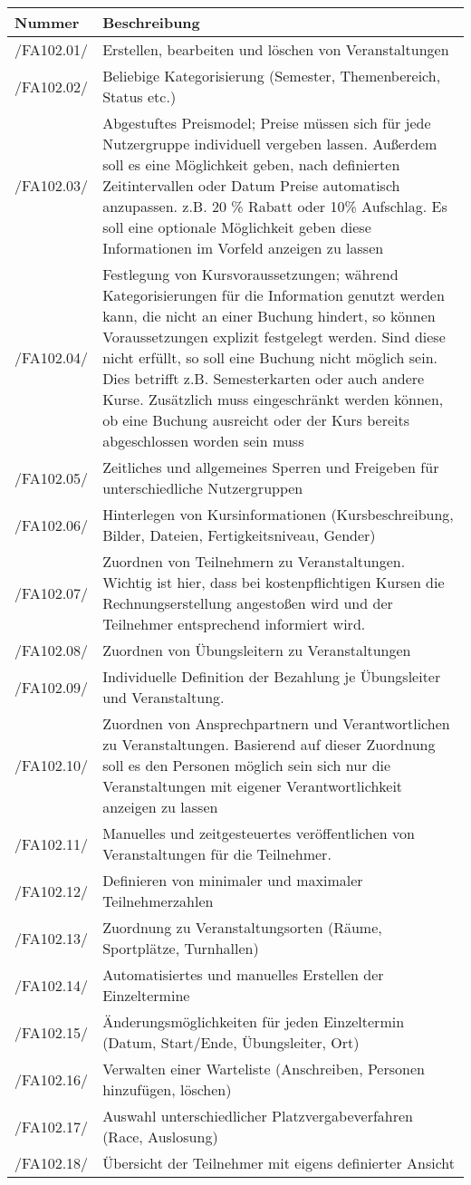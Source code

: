 \documentclass[a4paper,11pt]{article}
\newcommand\addrow[2]{#1 &#2\\ }
\newcommand\addheading[2]{#1 &#2\\ \hline}
\newcommand\tabularhead{\begin{tabular}{lp{13cm}}
\hline
}
\newenvironment{usecase}{\tabularhead}
{\hline\end{tabular}}
\begin{document}
\begin{usecase}
  \addheading{Nummer}{Beschreibung} 
  \addrow{/FA102.01/}{Erstellen, bearbeiten und löschen von Veranstaltungen}
  \addrow{/FA102.02/}{Beliebige Kategorisierung (Semester, Themenbereich, Status etc.)}
  \addrow{/FA102.03/}{Abgestuftes Preismodel; Preise müssen sich für jede Nutzergruppe individuell vergeben lassen. Außerdem soll es eine Möglichkeit geben, nach definierten Zeitintervallen oder Datum Preise automatisch anzupassen. z.B. 20 \% Rabatt oder 10\% Aufschlag. Es soll eine optionale Möglichkeit geben diese Informationen im Vorfeld anzeigen zu lassen}
  \addrow{/FA102.04/}{Festlegung von Kursvoraussetzungen; während Kategorisierungen für die Information genutzt werden kann, die nicht an einer Buchung hindert, so können Voraussetzungen explizit festgelegt werden. Sind diese nicht erfüllt, so soll eine Buchung nicht möglich sein. Dies betrifft z.B. Semesterkarten oder auch andere Kurse. Zusätzlich muss eingeschränkt werden können, ob eine Buchung ausreicht oder der Kurs bereits abgeschlossen worden sein muss}
  \addrow{/FA102.05/}{Zeitliches und allgemeines Sperren und Freigeben für unterschiedliche Nutzergruppen}
  \addrow{/FA102.06/}{Hinterlegen von Kursinformationen (Kursbeschreibung, Bilder, Dateien, Fertigkeitsniveau, Gender)}
  \addrow{/FA102.07/}{Zuordnen von Teilnehmern zu Veranstaltungen. Wichtig ist hier, dass bei kostenpflichtigen Kursen die Rechnungserstellung angestoßen wird und der Teilnehmer entsprechend informiert wird.}
  \addrow{/FA102.08/}{Zuordnen von Übungsleitern zu Veranstaltungen}
  \addrow{/FA102.09/}{Individuelle Definition der Bezahlung je Übungsleiter und Veranstaltung.}
  \addrow{/FA102.10/}{Zuordnen von Ansprechpartnern und Verantwortlichen zu Veranstaltungen. Basierend auf dieser Zuordnung soll es den Personen möglich sein sich nur die Veranstaltungen mit eigener Verantwortlichkeit anzeigen zu lassen}
  \addrow{/FA102.11/}{Manuelles und zeitgesteuertes veröffentlichen von Veranstaltungen für die Teilnehmer. }
  \addrow{/FA102.12/}{Definieren von minimaler und maximaler Teilnehmerzahlen}
  \addrow{/FA102.13/}{Zuordnung zu Veranstaltungsorten (Räume, Sportplätze, Turnhallen)}
  \addrow{/FA102.14/}{Automatisiertes und manuelles Erstellen der Einzeltermine}
  \addrow{/FA102.15/}{Änderungsmöglichkeiten für jeden Einzeltermin (Datum, Start/Ende, Übungsleiter, Ort)}
  \addrow{/FA102.16/}{Verwalten einer Warteliste (Anschreiben, Personen hinzufügen, löschen)}
  \addrow{/FA102.17/}{Auswahl unterschiedlicher Platzvergabeverfahren (Race, Auslosung)}
  \addrow{/FA102.18/}{Übersicht der Teilnehmer mit eigens definierter Ansicht}

\end{usecase}
\end{document}
